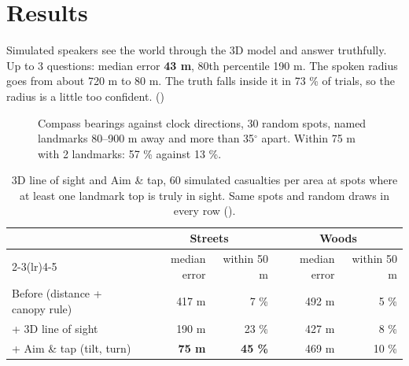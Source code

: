 \section{Results}

\begin{keyresult}
Simulated speakers see the world through the 3D model and answer truthfully. Up to 3 questions: median error
\textbf{43 m}, 80th percentile 190 m. The spoken radius goes from about 720 m to 80 m. The truth falls inside it
in 73 \% of trials, so the radius is a little too confident. ()
\end{keyresult}

\begin{figure}[htbp]\centering
{}
\caption{Compass bearings against clock directions, 30 random spots, named landmarks 80--900 m away and more than
35$^\circ$ apart. Within 75 m with 2 landmarks: 57 \% against 13 \%.}\label{fig:compasschart}
\end{figure}

\begin{table}[htbp]\centering\small
\caption{3D line of sight and Aim \& tap, 60 simulated casualties per area at spots where at least one landmark
top is truly in sight. Same spots and random draws in every row ().}\label{tab:geomatics}
\begin{tabular}{lrrrr}
\toprule
& \multicolumn{2}{c}{Streets} & \multicolumn{2}{c}{Woods}\\
\cmidrule(lr){2-3}\cmidrule(lr){4-5}
& median error & within 50 m & median error & within 50 m\\
\midrule
Before (distance + canopy rule) & 417 m & 7 \% & 492 m & 5 \%\\
+ 3D line of sight & 190 m & 23 \% & 427 m & 8 \%\\
+ Aim \& tap (tilt, turn) & \textbf{75 m} & \textbf{45 \%} & 469 m & 10 \%\\
\bottomrule
\end{tabular}
\end{table}

